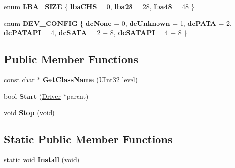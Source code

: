 \begin{DoxyCompactItemize}
enum {\bfseries L\+B\+A\+\_\+\+S\+I\+ZE} \{ {\bfseries lba\+C\+HS} = 0, 
{\bfseries lba28} = 28, 
{\bfseries lba48} = 48
 \}
\item 
\mbox{\label{class_a_t_a_driver_a48384380799c33052841dcbb45e0e155}} 
enum {\bfseries D\+E\+V\+\_\+\+C\+O\+N\+F\+IG} \{ \newline
{\bfseries dc\+None} = 0, 
{\bfseries dc\+Unknown} = 1, 
{\bfseries dc\+P\+A\+TA} = 2, 
{\bfseries dc\+P\+A\+T\+A\+PI} = 4, 
\newline
{\bfseries dc\+S\+A\+TA} = 2 + 8, 
{\bfseries dc\+S\+A\+T\+A\+PI} = 4 + 8
 \}
\end{DoxyCompactItemize}
\subsection*{Public Member Functions}
\begin{DoxyCompactItemize}
\item 
\mbox{\label{class_a_t_a_driver_a8d56d9f4b87682c25e695014a6c22f28}} 
const char $\ast$ {\bfseries Get\+Class\+Name} (U\+Int32 level)
\item 
\mbox{\label{class_a_t_a_driver_a513bb44e2306fd92d7f235efd2450d28}} 
bool {\bfseries Start} (\hyperlink{class_driver}{Driver} $\ast$parent)
\item 
\mbox{\label{class_a_t_a_driver_a60a7add2dcd7b21d8c927b6a32bc9ade}} 
void {\bfseries Stop} (void)
\end{DoxyCompactItemize}
\subsection*{Static Public Member Functions}
\begin{DoxyCompactItemize}
\item 
\mbox{\label{class_a_t_a_driver_aa0d70f348001d302c2636679dbf384f2}} 
static void {\bfseries Install} (void)
\end{DoxyCompactItemize}

